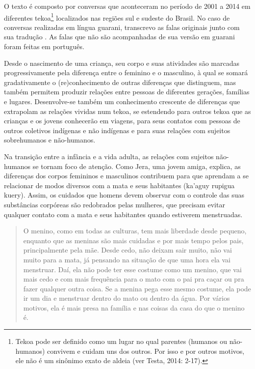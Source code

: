 O texto é composto por conversas que aconteceram no período de 2001 a
2014 em diferentes tekoa\footnote{Tekoa pode ser definido como um lugar
no qual parentes (humanos ou não-humanos) convivem e cuidam uns dos
outros. Por isso e por outros motivos, ele não é um sinônimo exato de
aldeia (ver Testa, 2014: 2-17).} localizados nas regiões sul e
sudeste do Brasil. No caso de conversas realizadas em língua guarani,
transcrevo as falas originais junto com sua tradução\footnotemark
{}. As falas que não são acompanhadas
de sua versão em guarani foram feitas em português.

Desde o nascimento de uma criança, seu corpo e suas atividades são
marcadas progressivamente pela diferença entre o feminino e o
masculino, à qual se somará gradativamente o (re)conhecimento de outras
diferenças que distinguem, mas também permitem produzir relações entre
pessoas de diferentes gerações, famílias e lugares. Desenvolve-se
também um conhecimento crescente de diferenças que extrapolam as
relações vividas num tekoa, se estendendo para outros tekoa que as
crianças e os jovens conhecerão em viagens, para seus contatos com
pessoas de outros coletivos indígenas e não indígenas e para suas
relações com sujeitos sobrehumanos e não-humanos. 

Na transição entre a infância e a vida adulta, as relações com sujeitos
não-humanos se tornam foco de atenção. Como Jera, uma jovem amiga,
explica, as diferenças dos corpos femininos e masculinos contribuem
para que aprendam a se relacionar de modos diversos com a mata e seus
habitantes (ka’aguy rupigua kuery). Assim, os cuidados que homens devem
observar com o controle das suas substâncias corpóreas são redobrados
pelas mulheres, que precisam evitar qualquer contato com a mata e seus
habitantes quando estiverem menstruadas. 

\begin{quotation}
O menino, como em todas as culturas, tem mais liberdade desde pequeno,
enquanto que as meninas são mais cuidadas e por mais tempo pelos pais,
principalmente pela mãe. Desde cedo, não deixam sair muito, não vai
muito para a mata, já pensando na situação de que uma hora ela vai
menstruar. Daí, ela não pode ter esse costume como um menino, que vai
mais cedo e com mais frequência para o mato com o pai pra caçar ou pra
fazer qualquer outra coisa. Se a menina pega esse mesmo costume, ela
pode ir um dia e menstruar dentro do mato ou dentro da água. Por vários
motivos, ela é mais presa na família e nas coisas da casa do que o
menino é.
\end{quotation}

